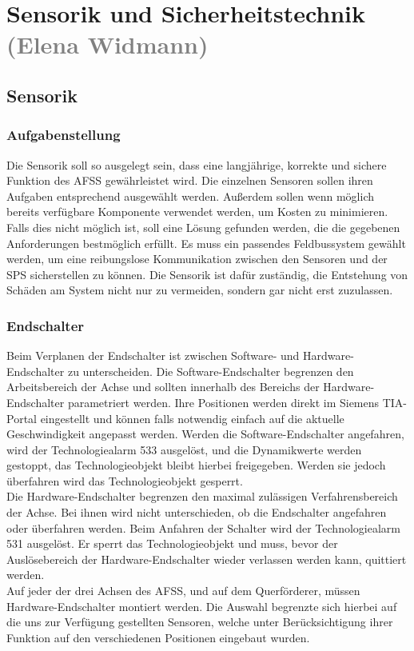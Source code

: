 \section{Sensorik und Sicherheitstechnik \textcolor{gray}{(Elena Widmann)}}
\label{sec:Sensorik und Sicherheitstechnik}

\subsection{Sensorik}
\label{sec:Sensorik}
\subsubsection{Aufgabenstellung}
Die Sensorik soll so ausgelegt sein, dass eine langjährige, korrekte und sichere Funktion des AFSS gewährleistet wird. Die einzelnen Sensoren sollen ihren Aufgaben entsprechend ausgewählt werden. Außerdem sollen wenn möglich bereits verfügbare Komponente verwendet werden, um Kosten zu minimieren. Falls dies nicht möglich ist, soll eine Lösung gefunden werden, die die gegebenen Anforderungen bestmöglich erfüllt. Es muss ein passendes Feldbussystem gewählt werden, um eine reibungslose Kommunikation zwischen den Sensoren und der SPS sicherstellen zu können. Die Sensorik ist dafür zuständig, die Entstehung von Schäden am System nicht nur zu vermeiden, sondern gar nicht erst zuzulassen.

\subsubsection{Endschalter}
Beim Verplanen der Endschalter ist zwischen Software- und Hardware-Endschalter zu unterscheiden. Die Software-Endschalter begrenzen den Arbeitsbereich der Achse und sollten innerhalb des Bereichs der Hardware-Endschalter parametriert werden. Ihre Positionen werden direkt im Siemens TIA-Portal eingestellt und können falls notwendig einfach auf die aktuelle Geschwindigkeit angepasst werden. Werden die Software-Endschalter angefahren, wird der Technologiealarm 533 ausgelöst, und die Dynamikwerte werden gestoppt, das Technologieobjekt bleibt hierbei freigegeben. Werden sie jedoch überfahren wird das Technologieobjekt gesperrt. \\
Die Hardware-Endschalter begrenzen den maximal zulässigen Verfahrensbereich der Achse. Bei ihnen wird nicht unterschieden, ob die Endschalter angefahren oder überfahren werden. Beim Anfahren der Schalter wird der Technologiealarm 531 ausgelöst. Er sperrt das Technologieobjekt und muss, bevor der Auslösebereich der Hardware-Endschalter wieder verlassen werden kann, quittiert werden. \cite{axis_manual}\\
Auf jeder der drei Achsen des AFSS, und auf dem Querförderer, müssen Hardware-Endschalter montiert werden. Die Auswahl begrenzte sich hierbei auf die uns zur Verfügung gestellten Sensoren, welche unter Berücksichtigung ihrer Funktion auf den verschiedenen Positionen eingebaut wurden.

